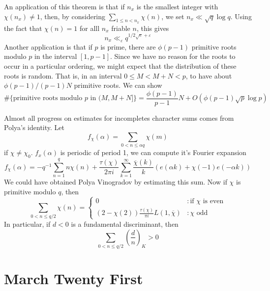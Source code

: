 An application of this theorem is that if $n_x$ is the smallest integer with $\chi(n_x) \neq 1$, then, by considering $\sum_{1 \leq n < n_x} \chi(n)$, we set $n_x \ll \sqrt{q} \log q$. Using the fact that $\chi(n) = 1$ for alll $n_x$ friable $n$, this gives
%
\[ n_x \ll_\varepsilon q^{1/2\sqrt{e} + \varepsilon} \]
%
Another application is that if $p$ is prime, there are $\phi(p-1)$ primitive roots modulo $p$ in the interval $[1,p-1]$. Since we have no reason for the roots to occur in a particular ordering, we might expect that the distribution of these roots is random. That is, in an interval $0 \leq M < M+N < p$, to have about $\phi(p-1)/(p-1)N$ primitive roots. We can show
%
\[ \# \{ \text{primitive roots modulo $p$ in $(M,M+N]$} \} = \frac{\phi(p-1)}{p-1} N + O \left( \phi(p-1) \sqrt{p} \log p \right) \]

Almost all progress on estimates for incompletes character sums comes from Polya's identity. Let
%
\[ f_\chi(\alpha) = \sum_{0 < n \leq \alpha q} \chi(m) \]
%
if $\chi \neq \chi_0$. $f_x(\alpha)$ is periodic of period 1, we can compute it's Fourier expansion
%
\[ f_\chi(\alpha) = -q^{-1} \sum_{n = 1}^q n \chi(n) + \frac{\tau(\chi)}{2 \pi i} \sum_{k = 1}^\infty \frac{\overline{\chi}(k)}{k} \left( e(\alpha k) + \chi(-1) e(-\alpha k) \right) \]
%
We could have obtained Polya Vinogradov by estimating this sum. Now if $\chi$ is primitive modulo $q$, then
%
\[ \sum_{0 < n \leq q/2} \chi(n) = \begin{cases} 0 & : \text{if $\chi$ is even} \\ (2 - \chi(2)) \frac{\tau(\chi)}{\pi i} L(1,\overline{\chi}) &: \text{$\chi$ odd} \end{cases} \]
%
In particular, if $d < 0$ is a fundamental discriminant, then
%
\[ \sum_{0 < n \leq q/2} \left( \frac{d}{n} \right)_K > 0 \]
%

\section{March Twenty First}

